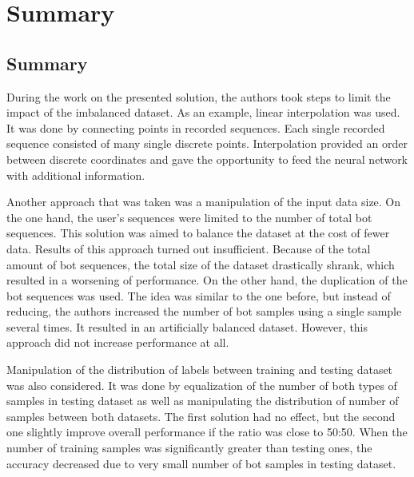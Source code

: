 \chapter{Summary}\label{ch:summary}

\section{Summary}\label{sec:summary}
During the work on the presented solution, the authors took steps to limit the impact of the imbalanced dataset.
As an example, linear interpolation was used.
It was done by connecting points in recorded sequences.
Each single recorded sequence consisted of many single discrete points.
Interpolation provided an order between discrete coordinates and gave the opportunity to feed the neural network with additional information.

Another approach that was taken was a manipulation of the input data size.
On the one hand, the user's sequences were limited to the number of total bot sequences.
This solution was aimed to balance the dataset at the cost of fewer data.
Results of this approach turned out insufficient.
Because of the total amount of bot sequences, the total size of the dataset drastically shrank, which resulted in a worsening of performance.
On the other hand, the duplication of the bot sequences was used.
The idea was similar to the one before, but instead of reducing, the authors increased the number of bot samples using a single sample several times.
It resulted in an artificially balanced dataset.
However, this approach did not increase performance at all.

Manipulation of the distribution of labels between training and testing dataset was also considered.
It was done by equalization of the number of both types of samples in testing dataset as well as manipulating the distribution of number of samples between both datasets.
The first solution had no effect, but the second one slightly improve overall performance if the ratio was close to \num{50}:\num{50}.
When the number of training samples was significantly greater than testing ones, the accuracy decreased due to very small number of bot samples in testing dataset.

